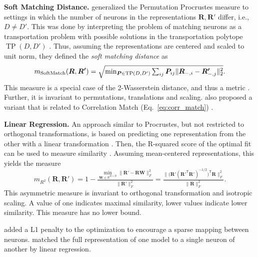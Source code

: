\documentclass{article}
\newcommand{\citet}{\textcite}
\newcommand{\Real}{\mathbb{R}}
\newcommand{\R}{\bm{R}}
\newcommand{\Rp}{\bm{R'}}
\newcommand{\transp}{\mathsf{T}}
\newcommand\myeqref[1]{%
    (\textup{Eq.~\ref{#1}})%
}
\newcommand{\subheader}{\textbf}
\begin{document}
\subheader{Soft Matching Distance.}
\citet{khosla_soft_2024} generalized the Permutation Procrustes measure to settings in which the number of neurons in the representations $\R, \Rp$ differ, i.e., $D \not= D'$.
This was done by interpreting the problem of matching neurons as a transportation problem with possible solutions in the transportation polytope $\operatorname{TP}(D,D')$ \cite{de_combinatorics_2013}.
Thus,  assuming the representations are centered and scaled to unit norm,
they defined the \emph{soft matching distance} as
\begin{equation}
    m_{\operatorname{SoftMatch}}(\R, \Rp) = \textstyle\sqrt{\min_{\bm{P} \in \operatorname{TP}(D,D')} \textstyle\sum_{ij} \bm{P}_{ij}\|\R_{\--,i} - \Rp_{\--,j}\|_2^2}.
\end{equation}
This measure is a special case of the 2-Wasserstein distance, and thus a metric \cite{khosla_soft_2024}.
Further, it is invariant to permutations, translations and scaling.
\citet{khosla_soft_2024} also proposed a variant that is related to Correlation Match \myeqref{eq:corr_match}.


\subheader{Linear Regression.}
An approach similar to Procrustes, but not restricted to orthogonal transformations, is based on predicting one representation from the other with a linear transformation \cite{li_convergent_2016,kornblith_similarity_2019}.
Then, the R-squared score of the optimal fit can be used to measure similarity \cite{kornblith_similarity_2019}.
Assuming mean-centered representations, this yields the measure
\begin{equation}
    m_{R^2}(\R, \Rp) = 1 - \tfrac{\min_{\bm{W}\in \Real^{D \times D}} \|\Rp - \R \bm{W}\|_F^2}{\|\Rp\|_F^2} = \tfrac{\big\|\big(\Rp(\Rp^\transp\Rp)^{-1/2}\big)^\transp \R\big\|_F^2}{\|\R\|_F^2}.
\end{equation}
This asymmetric measure is invariant to orthogonal transformation and isotropic scaling.
A value of one indicates maximal similarity, lower values indicate lower similarity.
This measure has no lower bound.

\citet{li_convergent_2016} added a L1 penalty to the optimization to encourage a sparse mapping between neurons.
\citet{bau_identifying_2019} matched the full representation of one model to a single neuron of another by linear regression.
\end{document}
